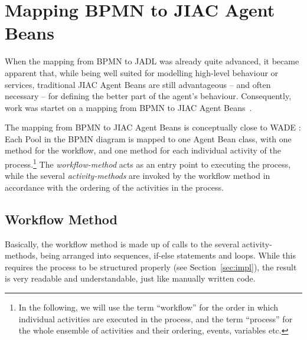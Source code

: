 

\section{Mapping BPMN to JIAC Agent Beans}
\label{sec:mapping}

When the mapping from BPMN to JADL was already quite advanced, it became apparent
that, while being well suited for modelling high-level behaviour or services,
traditional JIAC Agent Beans are still advantageous -- and often necessary --
for defining the better part of the agent's behaviour.  Consequently, work was
startet on a mapping from BPMN to JIAC Agent Beans~\cite{tan2011dipl}.

The mapping from BPMN to JIAC Agent Beans is conceptually close to WADE
\cite{caire2008wade}: Each Pool in the BPMN diagram is mapped to one Agent Bean
class, with one method for the workflow, and one method for each individual
activity of the process.\footnote{In the following, we will use the term
``workflow'' for the order in which individual activities are executed in the
process, and the term ``process'' for the whole ensemble of activities and their
ordering, events, variables etc.} The \emph{workflow-method} acts as an entry
point to executing the process, while the several \emph{activity-methods} are
invoked by the workflow method in accordance with the ordering of the activities
in the process.



\subsection{Workflow Method}

Basically, the workflow method is made up of calls to the several activity-methods,
being arranged into sequences, if-else statements and loops.  While this requires
the process to be structured properly (see Section~\ref{sec:impl}), the result is
very readable and understandable, just like manually written code.

